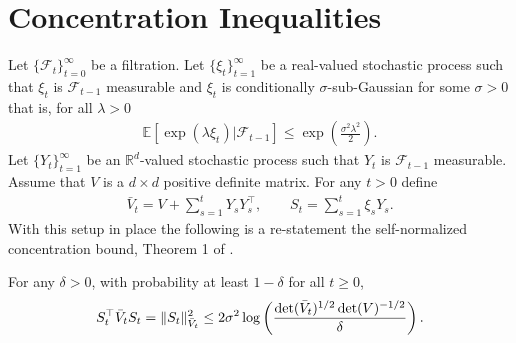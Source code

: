 \section{Concentration Inequalities}  \label{sec:tech}

Let $\{\mathcal{F}_{t}\}_{t=0}^{\infty}$ be a filtration. Let $\{\xi_t\}_{t=1}^{\infty}$ be a real-valued stochastic process such that $\xi_t$ is $\mathcal{F}_{t-1}$ measurable and $\xi_t$ is conditionally $\sigma$-sub-Gaussian for some $\sigma>0$ that is, for all $\lambda>0$
\begin{align*}
    \mathbb{E}\left[\exp(\lambda \xi_t)\big\lvert \mathcal{F}_{t-1} \right] \le \exp\left( \frac{\sigma^2\lambda^2}{2}\right).
\end{align*}
Let $\{Y_t\}_{t=1}^\infty$ be an $\mathbb{R}^d$-valued stochastic process such that $Y_t$ is $\mathcal{F}_{t-1}$ measurable. Assume that $V$ is a $d\times d$ positive definite matrix. For any $t>0$ define
\begin{align*}
    \bar{V}_t = V + \sum_{s=1}^t Y_s Y_s^{\top}, \qquad S_t = \sum_{s=1}^{t} \xi_s Y_s.
\end{align*}
With this setup in place the following is a re-statement the self-normalized concentration bound, Theorem 1 of \citep{abbasi2011improved}.

\begin{theorem}\label{thm:selfnormalized} For any $\delta>0$, with probability at least $1-\delta$ for all $t\ge 0$,
\begin{align*}
    S_t^{\top}\bar{V}_tS_t = \lVert S_t \rVert_{\bar{V}_t}^2 \le 2\sigma^2 \log\left( \frac{\det(\bar{V}_t)^{1/2}\det(V)^{-1/2}}{\delta}\right).
\end{align*}
\end{theorem}









